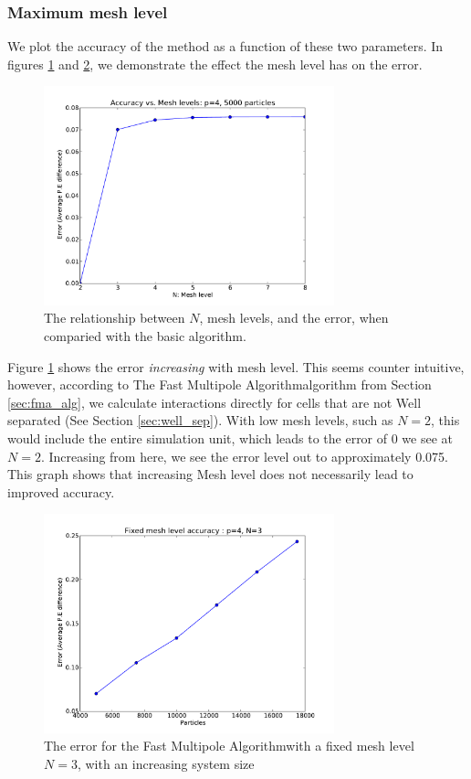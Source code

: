 \documentclass[pdftex,twoside,a4paper]{report}
\newcommand{\bcen}{\begin{center}}
\newcommand{\ecen}{\end{center}}
\newcommand{\fma}{Fast Multipole Algorithm}
\begin{document}
\subsubsection{Maximum mesh level}
We plot the accuracy of the method as a function of these two parameters. In figures \ref{fig:fma_mesh_acc} and \ref{fig:fma_fixed_mesh_acc}, we demonstrate the effect the mesh level has on the error. 

\begin{figure}[H]
\bcen \includegraphics[width=0.75\textwidth]{figures/graphs/fma_mesh_acc.pdf} \ecen
\caption{The relationship between $N$, mesh levels, and the error, when comparied with the basic algorithm.}
\label{fig:fma_mesh_acc}
\end{figure}

Figure \ref{fig:fma_mesh_acc} shows the error \emph{increasing} with mesh level. This seems counter intuitive, however, according to The \fma algorithm from Section \ref{sec:fma_alg}, we calculate interactions directly for cells that are not Well separated (See Section \ref{sec:well_sep}). With low mesh levels, such as $N=2$, this would include the entire simulation unit, which leads to the error of 0 we see at $N=2$. Increasing from here, we see the error level out to approximately 0.075. This graph shows that increasing Mesh level does not necessarily lead to improved accuracy.

\begin{figure}[H]
\bcen \includegraphics[width=0.75\textwidth]{figures/graphs/fma_fixed_mesh_acc.pdf} \ecen
\caption{The error for the \fma with a fixed mesh level $N=3$, with an increasing system size}
\label{fig:fma_fixed_mesh_acc}
\end{figure}
\end{document}
